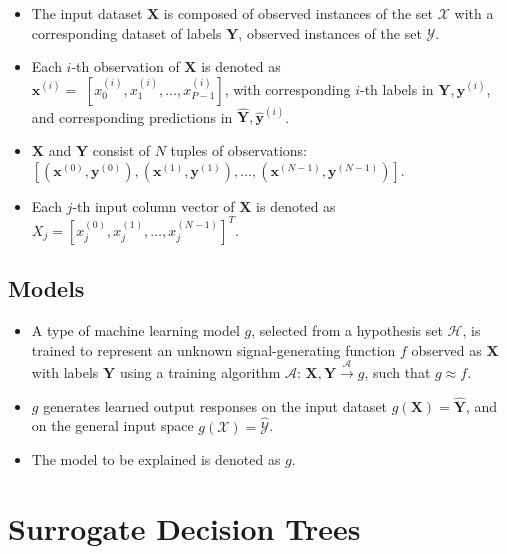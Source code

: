 \documentclass[sigconf, review]{acmart}
\begin{document}
	\begin{itemize}
		\item The input dataset $\mathbf{X}$ is composed of observed instances of the set $\mathcal{X}$ with a corresponding dataset of labels $\mathbf{Y}$, observed instances of the set $\mathcal{Y}$. 
		\item Each $i$-th observation of $\mathbf{X}$ is denoted as\\ $\mathbf{x}^{(i)} = $  
		$[x_0^{(i)}, x_1^{(i)}, \dots, x_{\textit{P}-1}^{(i)}]$, with corresponding $i$-th labels in $\mathbf{Y}, \mathbf{y}^{(i)}$, and corresponding predictions in $\mathbf{\hat{Y}}, \mathbf{\hat{y}}^{(i)}$. %
		\item $\mathbf{X}$ and $\mathbf{Y}$ consist of $N$ tuples of observations:\\ $[(\mathbf{x}^{(0)},\mathbf{y}^{(0)}), (\mathbf{x}^{(1)},\mathbf{y}^{(1)}), \dots,(\mathbf{x}^{(N-1)},\mathbf{y}^{(N-1)})]$. %
		\item Each $j$-th input column vector of $\mathbf{X}$ is denoted as $X_j = [x_{j}^{(0)}, x_{j}^{(1)}, \dots, x_{j}^{(N-1)}]^T$.
	\end{itemize}	 

\subsection{Models}

	\begin{itemize}
		\item A type of machine learning model $g$, selected from a hypothesis set $\mathcal{H}$, is trained to represent an unknown signal-generating function $f$ observed as  $\mathbf{X}$ with labels $\mathbf{Y}$ using a training algorithm $\mathcal{A}$: 
		$ \mathbf{X}, \mathbf{Y} \xrightarrow{\mathcal{A}} g$, such that $g \approx f$.
		\item $g$ generates learned output responses on the input dataset $g(\mathbf{X}) = \mathbf{\hat{Y}}$, and on the general input space $g(\mathcal{X}) = \mathcal{\hat{Y}}$.
		\item The model to be explained is denoted as $g$.
	\end{itemize}

\section{Surrogate Decision Trees} \label{sec:surrogate_dt}
\end{document}
